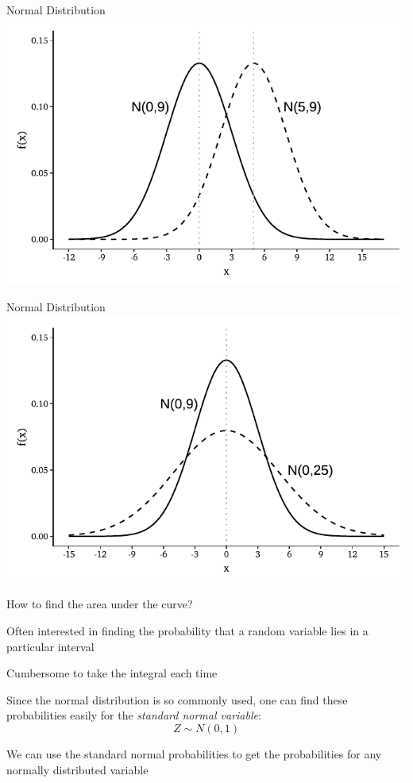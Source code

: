 \documentclass{./../div_teaching_slides}
\begin{document}
\begin{frame}{Normal Distribution}
\centering
\includegraphics{./../../output/norm1}
\end{frame}


\begin{frame}{Normal Distribution}
\centering
\includegraphics{./../../output/norm2}
\end{frame}

\begin{frame}{How to find the area under the curve?}
\begin{witemize}
  \item Often interested in finding the probability that a random variable lies in a particular interval
  \item Cumbersome to take the integral each time
  \item Since the normal distribution is so commonly used, one can find these probabilities easily for the \textit{standard normal variable}: $$Z \sim N(0, 1)$$
  \item We can use the standard normal probabilities to get the probabilities for any normally distributed variable
\end{witemize}
\end{frame}
\end{document}
